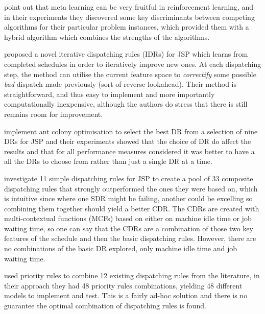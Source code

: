 \documentclass[smallextended]{svjour3}
\begin{document}
	\citet{Kalyanakrishnan11} point out that meta learning can be very fruitful in reinforcement learning, and in their experiments they discovered some key discriminants between competing algorithms for their particular problem instances, which provided them with a hybrid algorithm which combines the strengths of the algorithms.
	
	\citet{Nguyen13} proposed a novel iterative dispatching rules (IDRs) for JSP which learns from completed schedules in order to iteratively improve new ones. At each dispatching step, the method can utilise the current feature space to \emph{correctify} some possible \emph{bad} dispatch made previously (sort of reverse lookahead).
	Their method is straightforward, and thus easy to implement and more importantly computationally inexpensive, although the authors do stress that there is still remains room for improvement. 
	
	\citet{Korytkowski13} implement ant colony optimisation to select the best DR from a selection of nine DRs for JSP and their experiments showed that the choice of DR do affect the results and that for all performance measures considered it was better to have a all the DRs to choose from rather than just a single DR at a time. 
	
	\citet{Lu13} investigate 11 simple dispatching rules for JSP to create a pool of 33 composite dispatching rules that strongly outperformed the ones they were based on, which is intuitive since where one SDR might be failing, another could be excelling so combining them together should yield a better CDR. The CDRs are created with multi-contextual functions (MCFs) based on either on machine idle time or job waiting time, so one can say that the CDRs are a combination of those two key features of the schedule and then the basic dispatching rules. However, there are no combinations of the basic DR explored, only machine idle time and job waiting time.  
	
	\citet{Yu13} used priority rules to combine 12 existing dispatching rules from the literature, in their approach they had 48 priority rules combinations, yielding 48 different models to implement and test. This is a fairly ad-hoc solution and there is no guarantee the optimal combination of dispatching rules is found. 
	
	
	
\end{document}
